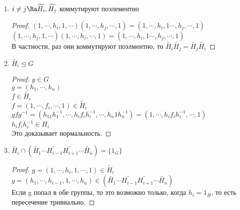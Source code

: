 \begin{conseq}
\begin{enumerate}
    \item $i \ne j \Ra \widetilde{H_i}, \widetilde{H_j}$ коммутируют поэлементно\\
    \begin{proof}
    $(1, \cdots, h_i, 1, \cdots)(1, \cdots, h_j, \cdots, 1) = (1, \cdots, h_i, 1 \cdots, h_j, \cdots, 1)$\\
    $(1, \cdots, h_j, 1, \cdots)(1, \cdots, h_i, \cdots, 1) = (1, \cdots, h_i, 1 \cdots, h_j, \cdots, 1)$\\

    В частности, раз они коммутируют поэлментно, то $\widetilde{H_i}\widetilde{H_j} = \widetilde{H_j}\widetilde{H_i}$
    \end{proof}
    \item $\widetilde{H_i} \unlhd G$\\
    \begin{proof}
    $g \in G$\\
    $g = (h_1, \cdots, h_n)$\\
    $f \in \widetilde{H_i} $\\
    $f = (1, \cdots, f_i,\cdots, 1) \in \widetilde{H_i}$\\
    $gfg^{-1} = (h_11h_1^{-1}, \cdots, h_if_ih_i^{-1}, \cdots, h_n1h_n^{-1}) = (1, \cdots, h_if_ih_i^{-1}, \cdots, 1)$\\
    $h_if_ih_i^{-1} \in H_i$\\
    Это доказывает нормальность. 
    \end{proof}
    \item $\widetilde{H_i} \cap (\widetilde{H_1} \cdots \widetilde{H_{i - 1}} \widetilde{H_{i + 1}} \cdots \widetilde{H_n}) = \{1_G\}$
    \begin{proof}
    $g = (1, \cdots, h_i, 1, \cdots, 1) \in \widetilde{H_i}$\\
    $g = (h_1, \cdots, h_{i - 1}, 1, \cdots, h_n) \in (\widetilde{H_1} \cdots \widetilde{H_{i - 1}} \widetilde{H_{i + 1}} \cdots \widetilde{H_n})$\\
    Если g попал в обе группы, то это возможно только, когда $h_i = 1_H$, то есть пересечение тривиально. 
    \end{proof}
\end{enumerate}
\end{conseq}
